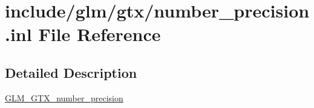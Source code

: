 \hypertarget{number__precision_8inl}{}\section{include/glm/gtx/number\+\_\+precision.inl File Reference}
\label{number__precision_8inl}


\subsection{Detailed Description}
\hyperlink{group__gtx__number__precision}{G\+L\+M\+\_\+\+G\+T\+X\+\_\+number\+\_\+precision} 